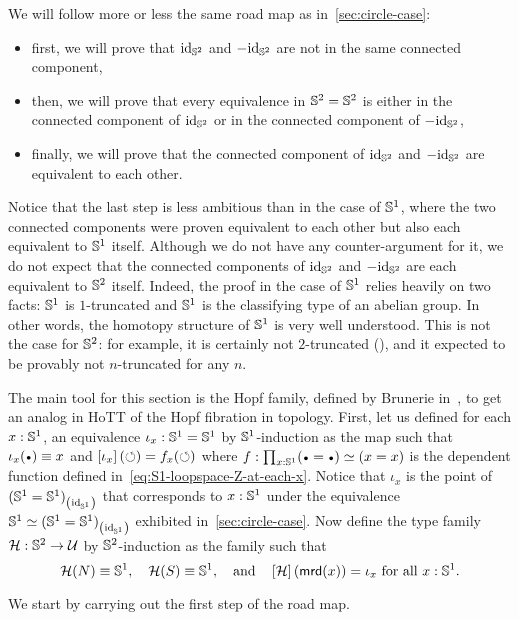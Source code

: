 \documentclass[english,a4]{article}
\renewcommand{\ap}[1]{\left[{#1}\right]}
\begin{document}
We will follow more or less the same road map as
in~\cref{sec:circle-case}:
\begin{itemize}
\item first, we will prove that $\mathord{\mathrm{id}}_{{\mathbb S^{2}}}$ and $-\mathord{\mathrm{id}}_{{\mathbb S^{2}}}$ are not in
  the same connected component,
\item then, we will prove that every equivalence in ${{\mathbb S^{2}}}={{\mathbb S^{2}}}$ is
  either in the connected component of $\mathord{\mathrm{id}}_{{\mathbb S^{2}}}$ or in the connected
  component of $-\mathord{\mathrm{id}}_{{\mathbb S^{2}}}$,
\item finally, we will prove that the connected component of $\mathord{\mathrm{id}}_{{\mathbb S^{2}}}$
  and $-\mathord{\mathrm{id}}_{{\mathbb S^{2}}}$ are equivalent to each other.
\end{itemize}
Notice that the last step is less ambitious than in the case of ${{\mathbb S^{1}}}$,
where the two connected components were proven equivalent to each
other but also each equivalent to ${{\mathbb S^{1}}}$ itself. Although we do not
have any counter-argument for it, we do not expect that the connected
components of $\mathord{\mathrm{id}}_{{\mathbb S^{2}}}$ and $-\mathord{\mathrm{id}}_{{\mathbb S^{2}}}$ are each equivalent to ${{\mathbb S^{2}}}$
itself. Indeed, the proof in the case of ${{\mathbb S^{1}}}$ relies heavily on two
facts: ${{\mathbb S^{1}}}$ is $1$-truncated and ${{\mathbb S^{1}}}$ is the classifying type of an
abelian group. In other words, the homotopy structure of ${{\mathbb S^{1}}}$ is very
well understood. This is not the case for ${{\mathbb S^{2}}}$: for example, it is
certainly not $2$-truncated (\cite{brunerie:thesis}), and it expected
to be provably not $n$-truncated for any $n$.

The main tool for this section is the Hopf family, defined by Brunerie
in~\cite{brunerie:thesis}, to get an analog in HoTT of the Hopf
fibration in topology. First, let us defined for each $x:{{\mathbb S^{1}}}$, an
equivalence $\iota_x: {{\mathbb S^{1}}}={{\mathbb S^{1}}}$ by ${{\mathbb S^{1}}}$-induction as the map such
that $\iota_x(\base) \jdeq x$ and $\ap{\iota_x}(\Sloop) = f_x(\Sloop)$
where $f\from \prod_{x\from\Sc} (\base=\base) \weq (x=x)$ is the
dependent function defined
in~\cref{eq:S1-loopspace-Z-at-each-x}. Notice that $\iota_x$ is the
point of ${({{\mathbb S^{1}}}={{\mathbb S^{1}}})}_{\left(\mathord{\mathrm{id}}_{{\mathbb S^{1}}}\right)}$ that corresponds to $x:{{\mathbb S^{1}}}$
under the equivalence ${{\mathbb S^{1}}} \simeq {({{\mathbb S^{1}}}={{\mathbb S^{1}}})}_{\left(\mathord{\mathrm{id}}_{{\mathbb S^{1}}}\right)}$
exhibited in~\cref{sec:circle-case}. Now define the type family
${\mathcal H}: {{\mathbb S^{2}}} \to \mathcal{U}$ by ${{\mathbb S^{2}}}$-induction as the family such that
\begin{displaymath}
  \hopf(N) \jdeq \Sc,\quad
  \hopf(S) \jdeq \Sc,\quad\text{and}\quad
  \ap\hopf (\mrd(x)) = \iota_x\ \text{for all}\ x:\Sc.
\end{displaymath}

We start by carrying out the first step of the road map.
\end{document}
